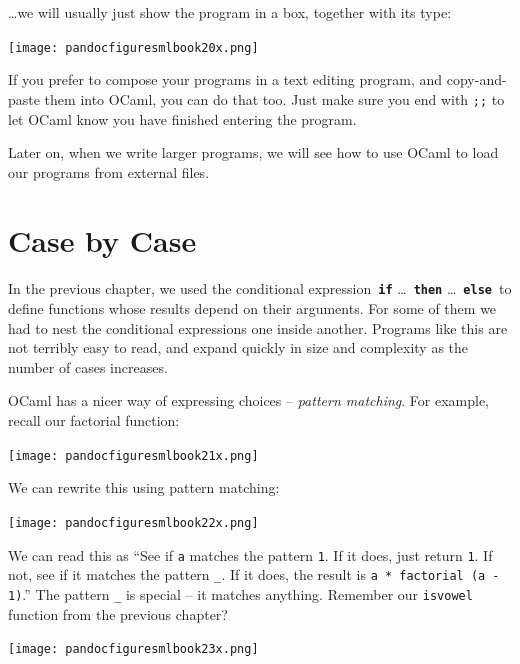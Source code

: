 \documentclass[]{book}
\begin{document}
\noindent\ldots we will usually just show the program in a box, together with its type:

\medskip
\begin{center}
\noindent\texttt{[image: pandocfiguresmlbook20x.png]}
\end{center}
\medskip

\noindent If you prefer to compose your programs in a text editing program, and copy-and-paste them into OCaml, you can do that too. Just make sure you end with \texttt{;;} to let OCaml know you have finished entering the program.

Later on, when we write larger programs, we will see how to use OCaml to load our programs from external files.


\chapter{Case by Case}
\pagestyle{fancy}
In the previous chapter, we used the conditional expression \,\textbf{\texttt{if}} \ldots\  \textbf{\texttt{then}} \ldots\ \textbf{\texttt{else}}\, to define functions whose results depend on their arguments. For some of them we had to nest the conditional expressions one inside another. Programs like this are not terribly easy to read, and expand quickly in size and complexity as the number of cases increases.

OCaml has a nicer way of expressing choices -- \textit{pattern matching}. For example, recall our factorial function:

\medskip
\begin{center}
\noindent\texttt{[image: pandocfiguresmlbook21x.png]}
\end{center}
\medskip

\noindent We can rewrite this using pattern matching:

\medskip
\begin{center}
\noindent\texttt{[image: pandocfiguresmlbook22x.png]}
\end{center}
\medskip

\noindent We can read this as ``See if \texttt{a} matches the pattern \texttt{1}. If it does, just return \texttt{1}. If not, see if it matches the pattern \texttt{\_}. If it does, the result is \verb!a * factorial (a - 1)!.'' The pattern \texttt{\_} is special -- it matches anything. Remember our \texttt{isvowel} function from the previous chapter?

\medskip
\begin{center}
\noindent\texttt{[image: pandocfiguresmlbook23x.png]}
\end{center}
\medskip
\end{document}
